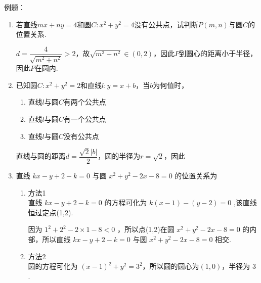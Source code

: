 例题：
\begin{enumerate}
    \item 若直线$mx+ny = 4$和圆$C: x^2+y^2 = 4$没有公共点，试判断$P(m,n)$与圆$C$的位置关系.
    \begin{jieda}
        $d = \dfrac{4}{\sqrt{m^2+n^2}} > 2$，故$\sqrt{m^2+n^2} \in (0, 2)$，因此$P$到圆心的距离小于半径，因此$P$在圆内.
    \end{jieda}
    \item 已知圆$C: x^2+y^2 = 2$和直线$l: y = x + b$，当$b$为何值时，
    \begin{enumerate}
        \item 直线$l$与圆$C$有两个公共点
        \item 直线$l$与圆$C$有一个公共点
        \item 直线$l$与圆$C$没有公共点
    \end{enumerate}
    \begin{jieda}
        直线与圆的距离$d = \dfrac{\sqrt{2}|b|}{2}$，圆的半径为$r = \sqrt{2}$，因此
    \end{jieda}
    
    \item 直线 ${kx} - y + 2 - k = 0$ 与圆 ${x}^{2} + {y}^{2} - {2x} - 8 = 0$ 的位置关系为
    \begin{jieda}
        \begin{enumerate}
            \item 方法1 \\
            直线 ${kx} - y + 2 - k = 0$ 的方程可化为 $k\left( {x - 1}\right)  - \left( {y - 2}\right)  = 0$ ,该直线恒过定点(1,2).
            
            因为 ${1}^{2} + {2}^{2} - 2 \times  1 - 8 < 0$ ，所以点(1,2)在圆 ${x}^{2} + {y}^{2} - {2x} - 8 = 0$ 的内部，所以直线 ${kx} - y + 2 - k = 0$ 与圆 ${x}^{2} + {y}^{2} - {2x} - 8 = 0$ 相交.

            \item 方法2 \\
            圆的方程可化为 ${\left( x - 1\right) }^{2} + {y}^{2} = {3}^{2}$，所以圆的圆心为$(1,0)$，半径为 $3$ . 
            

\end{enumerate}
\end{jieda}
\end{enumerate}
